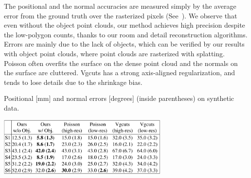 The positional and the normal accuracies are measured simply by the
average error from the ground truth over the rasterized pixels
(See~). We observe that even without the object
point clouds, our method achieves high precision despite the low-polygon
counts, thanks to our room and detail reconstruction algorithms.
Errors are mainly due to the lack of objects, which can be verified by
our results with object point clouds, where point clouds are rasterized
with splatting. Poisson often overfits the surface on the dense point
cloud and the normals on the surface are cluttered. Vgcuts has a strong
axis-aligned regularization, and tends to lose details due to the
shrinkage bias.
\begin{table}[!t]
\caption{Positional [mm] and normal errors [degrees] (inside
 parentheses) on synthetic data.}
\begin{center}
 \vspace{-0.5cm} 
\includegraphics[width=85mm]{../figures/quantitative.pdf}
\end{center}
\label{table:quantitative}
 \vspace{-0.3cm}
\end{table}


%
%



